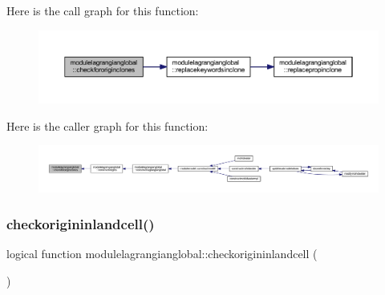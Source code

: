 Here is the call graph for this function\+:\nopagebreak
\begin{figure}[H]
\begin{center}
\leavevmode
\includegraphics[width=350pt]{namespacemodulelagrangianglobal_a3ffd33996e7947926b76916d8e614ab8_cgraph}
\end{center}
\end{figure}
Here is the caller graph for this function\+:\nopagebreak
\begin{figure}[H]
\begin{center}
\leavevmode
\includegraphics[width=350pt]{namespacemodulelagrangianglobal_a3ffd33996e7947926b76916d8e614ab8_icgraph}
\end{center}
\end{figure}
\mbox{\label{namespacemodulelagrangianglobal_a356193ac68adebe4d96ff99a2bb2ba2d}} 
\subsubsection{\texorpdfstring{checkorigininlandcell()}{checkorigininlandcell()}}
{\footnotesize\ttfamily logical function modulelagrangianglobal\+::checkorigininlandcell (\begin{DoxyParamCaption}{ }\end{DoxyParamCaption})\hspace{0.3cm}{\ttfamily [private]}}

